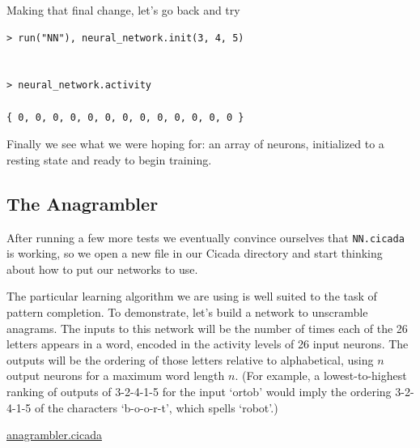 \documentclass{article}
\newenvironment{code}{
       \begin{list}{}{
               \setlength{\leftmargin}{.4in}
               \setlength{\rightmargin}{0in}
               \setlength{\topsep}{.2in}
       }
       \small
       \item[] }
       { \end{list}   }
\begin{document}
\noindent Making that final change, let's go back and try

\begin{code} \begin{verbatim}
> run("NN"), neural_network.init(3, 4, 5)


> neural_network.activity

{ 0, 0, 0, 0, 0, 0, 0, 0, 0, 0, 0, 0, 0 }
\end{verbatim} \end{code}

\noindent Finally we see what we were hoping for:  an array of neurons, initialized to a resting state and ready to begin training.



\subsection{The Anagrambler}

After running a few more tests we eventually convince ourselves that \verb#NN.cicada# is working, so we open a new file in our Cicada directory and start thinking about how to put our networks to use.

The particular learning algorithm we are using is well suited to the task of pattern completion.  To demonstrate, let's build a network to unscramble anagrams.  The inputs to this network will be the number of times each of the 26 letters appears in a word, encoded in the activity levels of 26 input neurons.  The outputs will be the ordering of those letters relative to alphabetical, using $n$ output neurons for a maximum word length $n$.  (For example, a lowest-to-highest ranking of outputs of 3-2-4-1-5 for the input `ortob' would imply the ordering 3-2-4-1-5 of the characters `b-o-o-r-t', which spells `robot'.)\\\vspace{.2in}

\noindent \underline{anagrambler.cicada}
\end{document}
